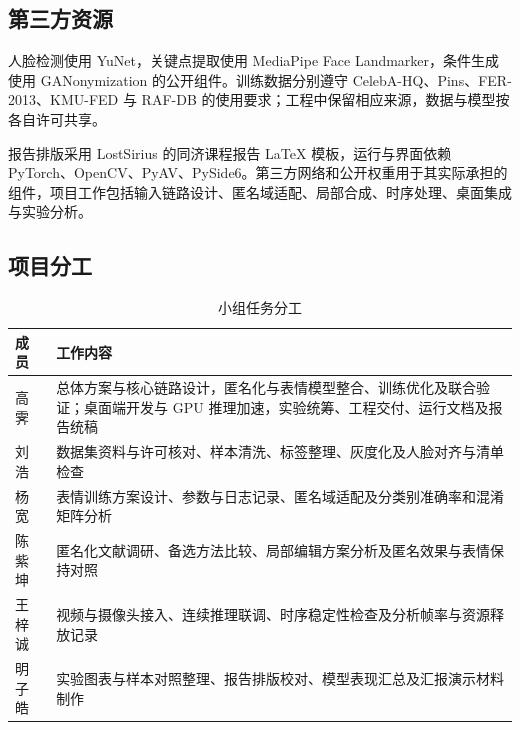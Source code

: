 \clearpage
\subsection{第三方资源}
人脸检测使用 YuNet，关键点提取使用 MediaPipe Face Landmarker，条件生成使用 GANonymization 的公开组件。训练数据分别遵守 CelebA-HQ、Pins、FER-2013、KMU-FED 与 RAF-DB 的使用要求；工程中保留相应来源，数据与模型按各自许可共享。

报告排版采用 LostSirius 的同济课程报告 LaTeX 模板，运行与界面依赖 PyTorch、OpenCV、PyAV、PySide6。第三方网络和公开权重用于其实际承担的组件，项目工作包括输入链路设计、匿名域适配、局部合成、时序处理、桌面集成与实验分析。

\subsection{项目分工}
\begin{table}[htbp]
\centering
\caption{小组任务分工}
\label{tab:division}
\begin{tabularx}{\linewidth}{@{}lX@{}}
\toprule
成员 & 工作内容\\
\midrule
高霁 & 总体方案与核心链路设计，匿名化与表情模型整合、训练优化及联合验证；桌面端开发与 GPU 推理加速，实验统筹、工程交付、运行文档及报告统稿\\
刘浩 & 数据集资料与许可核对、样本清洗、标签整理、灰度化及人脸对齐与清单检查\\
杨宽 & 表情训练方案设计、参数与日志记录、匿名域适配及分类别准确率和混淆矩阵分析\\
陈紫坤 & 匿名化文献调研、备选方法比较、局部编辑方案分析及匿名效果与表情保持对照\\
王梓诚 & 视频与摄像头接入、连续推理联调、时序稳定性检查及分析帧率与资源释放记录\\
明子皓 & 实验图表与样本对照整理、报告排版校对、模型表现汇总及汇报演示材料制作\\
\bottomrule
\end{tabularx}
\end{table}
